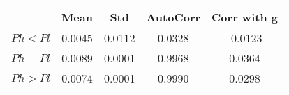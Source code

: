 \begin{tiny}\begin{tabular}{|l|c|c|c|c|}
\hline
&\textbf{Mean}&\textbf{Std}&\textbf{AutoCorr}&\textbf{Corr with g}\\\hline
\textbf{$Ph<Pl$}&0.0045&0.0112&0.0328&-0.0123\\\hline
\textbf{$Ph=Pl$}&0.0089&0.0001&0.9968&0.0364\\\hline
\textbf{$Ph>Pl$}&0.0074&0.0001&0.9990&0.0298\\\hline
\end{tabular}
\end{tiny}